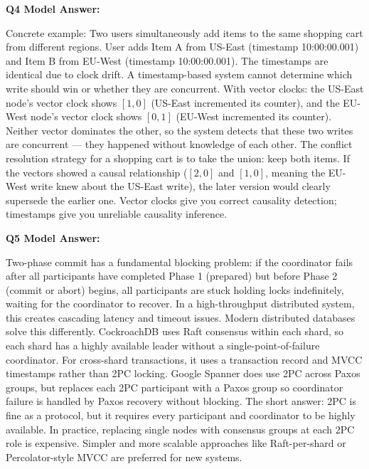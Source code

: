 \documentclass[11pt,a4paper]{article}
\begin{document}
\begin{answerbox}
\vspace{0.6em}

\textbf{Q4 Model Answer:}

Concrete example: Two users simultaneously add items to the same shopping cart from different regions. User adds Item A from US-East (timestamp 10:00:00.001) and Item B from EU-West (timestamp 10:00:00.001). The timestamps are identical due to clock drift. A timestamp-based system cannot determine which write should win or whether they are concurrent. With vector clocks: the US-East node's vector clock shows $[1, 0]$ (US-East incremented its counter), and the EU-West node's vector clock shows $[0, 1]$ (EU-West incremented its counter). Neither vector dominates the other, so the system detects that these two writes are concurrent --- they happened without knowledge of each other. The conflict resolution strategy for a shopping cart is to take the union: keep both items. If the vectors showed a causal relationship ($[2, 0]$ and $[1, 0]$, meaning the EU-West write knew about the US-East write), the later version would clearly supersede the earlier one. Vector clocks give you correct causality detection; timestamps give you unreliable causality inference.

\vspace{0.6em}

\textbf{Q5 Model Answer:}

Two-phase commit has a fundamental blocking problem: if the coordinator fails after all participants have completed Phase 1 (prepared) but before Phase 2 (commit or abort) begins, all participants are stuck holding locks indefinitely, waiting for the coordinator to recover. In a high-throughput distributed system, this creates cascading latency and timeout issues. Modern distributed databases solve this differently. CockroachDB uses Raft consensus within each shard, so each shard has a highly available leader without a single-point-of-failure coordinator. For cross-shard transactions, it uses a transaction record and MVCC timestamps rather than 2PC locking. Google Spanner does use 2PC across Paxos groups, but replaces each 2PC participant with a Paxos group so coordinator failure is handled by Paxos recovery without blocking. The short answer: 2PC is fine as a protocol, but it requires every participant and coordinator to be highly available. In practice, replacing single nodes with consensus groups at each 2PC role is expensive. Simpler and more scalable approaches like Raft-per-shard or Percolator-style MVCC are preferred for new systems.
\end{answerbox}
\end{document}
